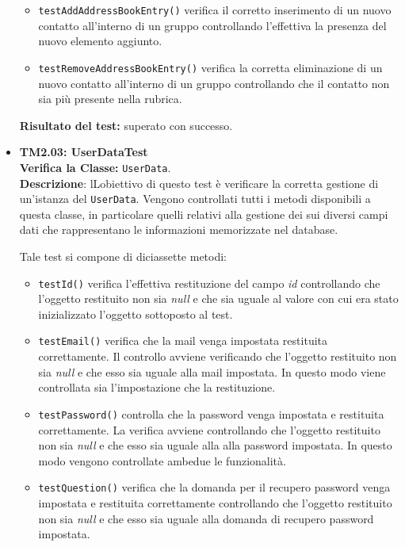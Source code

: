 \begin{itemize}
\begin{itemize}
\item \texttt{testAddAddressBookEntry()} verifica il corretto inserimento di un nuovo contatto all'interno di un gruppo controllando l'effettiva la presenza del nuovo elemento aggiunto.

\item \texttt{testRemoveAddressBookEntry()}  
verifica la corretta eliminazione di un nuovo contatto all'interno di un gruppo controllando che il contatto non sia più presente nella rubrica.

\end{itemize}
\textbf{Risultato del test:} superato con successo.

\item \textbf{TM2.03: UserDataTest}\\
\textbf{Verifica la Classe:} \texttt{UserData}.\\
\textbf{Descrizione}: lLobiettivo di questo test è verificare la corretta gestione di un'istanza del  \texttt{UserData}. Vengono controllati tutti i metodi disponibili a questa classe, in particolare quelli relativi alla gestione dei sui diversi campi dati che rappresentano le informazioni memorizzate nel database.

Tale test si compone di diciassette metodi:
\begin{itemize}

\item \texttt{testId()} verifica l'effettiva restituzione del campo \textit{id} controllando che l'oggetto restituito non sia \textit{null} e che sia uguale al valore con cui era stato inizializzato l'oggetto sottoposto al test.

\item \texttt{testEmail()} verifica che la mail venga impostata restituita correttamente. Il controllo avviene verificando che l'oggetto restituito non sia \textit{null} e che esso sia uguale alla mail impostata. In questo modo viene controllata sia l'impostazione che la restituzione. 

\item \texttt{testPassword()} controlla che la password venga impostata e restituita correttamente. La verifica avviene controllando che l'oggetto restituito non sia \textit{null} e che esso sia uguale alla alla password impostata. In questo modo vengono controllate ambedue le funzionalità.

\item \texttt{testQuestion()} verifica che la domanda per il recupero password venga impostata e restituita correttamente controllando che l'oggetto restituito non sia \textit{null} e che esso sia uguale alla domanda di recupero password impostata.


\end{itemize}
\end{itemize}
